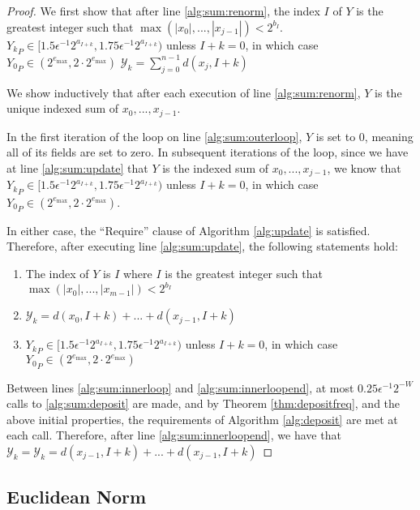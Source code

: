     \begin{proof}

      We first show that after line \ref{alg:sum:renorm}, the index $I$ of $Y$ is the greatest integer such that $\max(|x_0|, ..., |x_{j - 1}|) < 2^{b_I}$.
      \Statex ${Y_k}_P \in [1.5  \epsilon^{-1} 2^{a_{I + k}}, 1.75  \epsilon^{-1} 2^{a_{I + k}})$ unless $I + k = 0$, in which case ${Y_0}_P \in (2^{e_{\max}}, 2 \cdot 2^{e_{\max}})$
      \Statex $\mathcal{Y}_k = \sum\limits_{j = 0}^{n - 1}d(x_j, I + k)$

      We show inductively that after each execution of line \ref{alg:sum:renorm}, $Y$ is the unique indexed sum of $x_0, ..., x_{j - 1}$.

      In the first iteration of the loop on line \ref{alg:sum:outerloop}, $Y$ is set to 0, meaning all of its fields are set to zero.
      In subsequent iterations of the loop, since we have at line \ref{alg:sum:update} that $Y$ is the indexed sum of $x_0, ..., x_{j - 1}$, we know that ${Y_k}_P \in [1.5  \epsilon^{-1} 2^{a_{I + k}}, 1.75  \epsilon^{-1} 2^{a_{I + k}})$ unless $I + k = 0$, in which case ${Y_0}_P \in (2^{e_{\max}}, 2 \cdot 2^{e_{\max}})$.

      In either case, the ``Require'' clause of Algorithm \ref{alg:update} is satisfied. Therefore, after executing line \ref{alg:sum:update}, the following statements hold:
      \begin{enumerate}
      \item
        The index of $Y$ is $I$ where $I$ is the greatest integer such that $\max(|x_0|, ..., |x_{m - 1}|) < 2^{b_I}$
      \item
        $\mathcal{Y}_k = d(x_0, I + k) + ... + d(x_{j - 1}, I + k)$
      \item
        \Statex ${Y_k}_P \in [1.5  \epsilon^{-1} 2^{a_{I + k}}, 1.75  \epsilon^{-1} 2^{a_{I + k}})$ unless $I + k = 0$, in which case ${Y_0}_P \in (2^{e_{\max}}, 2 \cdot 2^{e_{\max}})$
      \end{enumerate}
      Between lines \ref{alg:sum:innerloop} and \ref{alg:sum:innerloopend}, at most $0.25\epsilon^{-1}2^{-W}$ calls to \ref{alg:sum:deposit} are made, and by Theorem \ref{thm:depositfreq}, and the above initial properties, the requirements of Algorithm \ref{alg:deposit} are met at each call. Therefore, after line \ref{alg:sum:innerloopend}, we have that $\mathcal{Y}_k = \mathcal{Y}_k = d(x_{j-1}, I + k) + ... + d(x_{j-1}, I + k)$
    \end{proof}

  \subsection{Euclidean Norm}
    \label{sec:compositeops_nrm}

